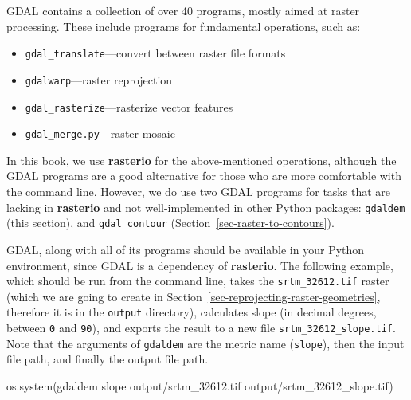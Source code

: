 \documentclass[
  letterpaper,
]{krantz}
\newenvironment{Shaded}{\begin{snugshade}}{\end{snugshade}}
\newcommand{\NormalTok}[1]{\textcolor[rgb]{0.00,0.23,0.31}{#1}}
\newcommand{\StringTok}[1]{\textcolor[rgb]{0.13,0.47,0.30}{#1}}
\providecommand{\tightlist}{%
  \setlength{\itemsep}{0pt}\setlength{\parskip}{0pt}}\usepackage{longtable,booktabs,array}
\begin{document}
\begin{tcolorbox}[enhanced jigsaw, coltitle=black, colback=white, opacitybacktitle=0.6, rightrule=.15mm, titlerule=0mm, colbacktitle=quarto-callout-note-color!10!white, colframe=quarto-callout-note-color-frame, title=\textcolor{quarto-callout-note-color}{\faInfo}\hspace{0.5em}{Note}, left=2mm, breakable, arc=.35mm, bottomtitle=1mm, toptitle=1mm, bottomrule=.15mm, opacityback=0, leftrule=.75mm, toprule=.15mm]

GDAL contains a collection of over 40 programs, mostly aimed at raster
processing. These include programs for fundamental operations, such as:

\begin{itemize}
\tightlist
\item
  \texttt{gdal\_translate}---convert between raster file formats
\item
  \texttt{gdalwarp}---raster reprojection
\item
  \texttt{gdal\_rasterize}---rasterize vector features
\item
  \texttt{gdal\_merge.py}---raster mosaic
\end{itemize}

In this book, we use \textbf{rasterio} for the above-mentioned
operations, although the GDAL programs are a good alternative for those
who are more comfortable with the command line. However, we do use two
GDAL programs for tasks that are lacking in \textbf{rasterio} and not
well-implemented in other Python packages: \texttt{gdaldem} (this
section), and \texttt{gdal\_contour}
(Section~\ref{sec-raster-to-contours}).

\end{tcolorbox}

GDAL, along with all of its programs should be available in your Python
environment, since GDAL is a dependency of \textbf{rasterio}. The
following example, which should be run from the command line, takes the
\texttt{srtm\_32612.tif} raster (which we are going to create in
Section~\ref{sec-reprojecting-raster-geometries}, therefore it is in the
\texttt{\textquotesingle{}output\textquotesingle{}} directory),
calculates slope (in decimal degrees, between \texttt{0} and
\texttt{90}), and exports the result to a new file
\texttt{srtm\_32612\_slope.tif}. Note that the arguments of
\texttt{gdaldem} are the metric name (\texttt{slope}), then the input
file path, and finally the output file path.

\begin{Shaded}
\begin{Highlighting}[]
\NormalTok{os.system(}\StringTok{\textquotesingle{}gdaldem slope output/srtm\_32612.tif output/srtm\_32612\_slope.tif\textquotesingle{}}\NormalTok{)}
\end{Highlighting}
\end{Shaded}
\end{document}
